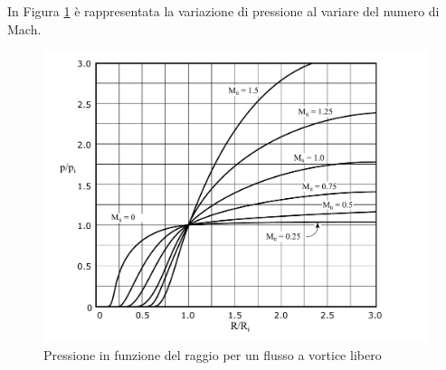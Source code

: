 In Figura \ref{fig:VorticeLibero} è rappresentata la variazione di pressione al variare del numero di Mach.
\begin{figure}
\centering
  \includegraphics[width=.8\textwidth]{fig/VorticeLibero.pdf}
\caption{Pressione in funzione del raggio per un flusso a vortice libero}
\label{fig:VorticeLibero}
\end{figure}

